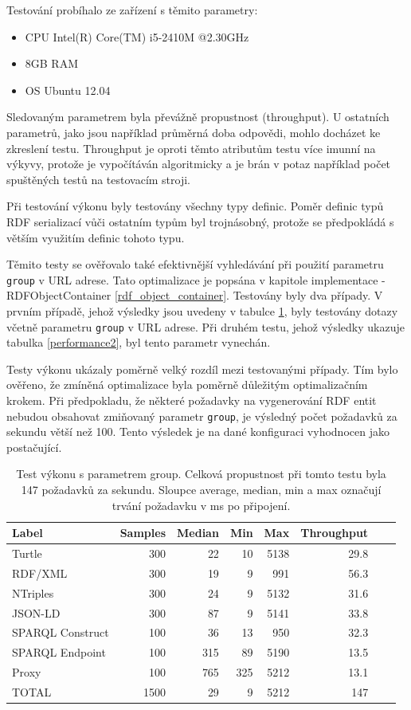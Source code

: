 \documentclass[thesis=B,czech]{FITthesis}[2012/06/26]
\begin{document}
  Testování probíhalo ze zařízení s těmito parametry:
  \begin{itemize}
   \item CPU Intel(R) Core(TM) i5-2410M @2.30GHz
   \item 8GB RAM
   \item OS Ubuntu 12.04
  \end{itemize}
  
  Sledovaným parametrem byla převážně propustnost (throughput). U ostatních parametrů, jako jsou například průměrná doba odpovědi, mohlo docházet ke zkreslení
  testu. Throughput je oproti těmto atributům testu více imunní na výkyvy, protože je vypočítáván algoritmicky a je brán v potaz například počet spuštěných
  testů na testovacím stroji.
  
  
  Při testování výkonu byly testovány všechny typy definic. Poměr definic typů RDF serializací vůči ostatním typům byl trojnásobný, protože se předpokládá
  s větším využitím definic tohoto typu.
  
  Těmito testy se ověřovalo také efektivnější vyhledávání při použití parametru \texttt{group} v URL adrese. 
  Tato optimalizace je popsána v kapitole implementace - RDFObjectContainer \ref{rdf_object_container}.
  Testovány byly dva případy. 
  V prvním případě, jehož výsledky jsou uvedeny v tabulce \ref{performance1}, byly testovány dotazy včetně parametru \texttt{group}
  v URL adrese. Při druhém testu, jehož výsledky ukazuje tabulka \ref{performance2}, byl tento parametr vynechán.
  
  Testy výkonu ukázaly poměrně velký rozdíl mezi testovanými případy. Tím bylo ověřeno, že zmíněná optimalizace byla poměrně důležitým optimalizačním krokem.
  Při předpokladu, že některé požadavky na vygenerování RDF entit nebudou obsahovat zmiňovaný parametr \texttt{group}, je výsledný počet požadavků za sekundu
  větší než 100. Tento výsledek je na dané konfiguraci vyhodnocen jako postačující.
  
    
  \begin{table}\centering
 	\caption[Test výkonu - s parametrem group]{Test výkonu s parametrem group. Celková propustnost při tomto testu byla 147 požadavků za sekundu. Sloupce average, median, min a max označují trvání požadavku v ms po připojení.}\label{performance1}
 	\begin{tabular}{|l|r|r|r|r|r|r|r|}\hline
\textbf{Label}		& 	\textbf{Samples}&		\textbf{Median} &\textbf{Min} &	\textbf{Max} &		\textbf{Throughput} \tabularnewline \hline \hline
 Turtle			&	300	&			22&	10 &	5138&		29.8\tabularnewline \hline
 RDF/XML 		&	300	&			19&	9&	991	&	56.3\tabularnewline \hline
 NTriples 		&	300	&			24&	9&	5132 	&	31.6\tabularnewline \hline
 JSON-LD 		&	300	&			87&	9&	5141 	&	33.8\tabularnewline \hline
 SPARQL Construct 	&	100	&			36&	13&	950 	&	32.3\tabularnewline \hline
 SPARQL Endpoint 	&	100	&			315&	89&	5190 	&	13.5\tabularnewline \hline
 Proxy 			&	100	&			765&	325&	5212 	&	13.1\tabularnewline \hline
TOTAL			&	1500	&			29&	9&	5212 	&	147\tabularnewline \hline
 	\end{tabular}
 \end{table}
 
\end{document}
